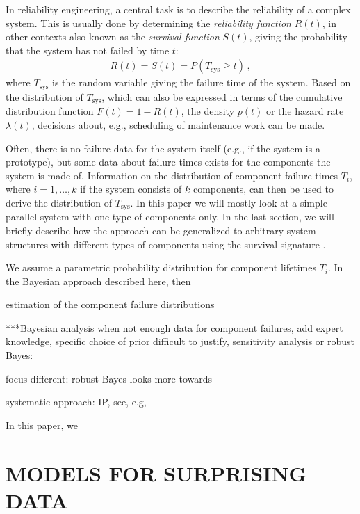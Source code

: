 \documentclass[12pt,a4paper,twocolumn,fleqn]{narms}
\begin{document}
In reliability engineering, a central task is to describe the reliability of a complex system.
This is usually done by determining the \emph{reliability function} $R(t)$,
in other contexts also known as the \emph{survival function} $S(t)$,
giving the probability that the system has not failed by time $t$:
\begin{align}
R(t) = S(t) = P(T_\text{sys} \geq t)\,,
\end{align}
where $T_\text{sys}$ is the random variable giving the failure time of the system. %
Based on the distribution of $T_\text{sys}$, which can also be expressed
in terms of the cumulative distribution function $F(t) = 1 - R(t)$,
the density $p(t)$ or the hazard rate $\lambda(t)$,
decisions about, e.g., scheduling of maintenance work can be made.

Often, there is no failure data for the system itself (e.g., if the system is a prototype),
but some data about failure times exists for the components the system is made of.
Information on the distribution of component failure times $T_i$,
where $i = 1, \ldots, k$ if the system consists of $k$ components,
can then be used to derive the distribution of $T_\text{sys}$.
In this paper we will mostly look at a simple parallel system with one type of components only.
In the last section, we will briefly describe
how the approach can be generalized to arbitrary system structures
with different types of components
using the survival signature \cite{2012:survsign,2014:bayessurvsign}.

We assume a parametric probability distribution for component lifetimes $T_i$.
In the Bayesian approach described here, then 

estimation of the component failure distributions


***Bayesian analysis when not enough data for component failures, add expert knowledge,
specific choice of prior difficult to justify,
sensitivity analysis or robust Bayes:
  \cite{2000:rios}
\cite{2000:bergerinsuaruggeri}

focus different: robust Bayes looks more towards 

systematic approach: IP, see, e.g, 

In this paper, we 

\section{MODELS FOR SURPRISING DATA}
\end{document}
